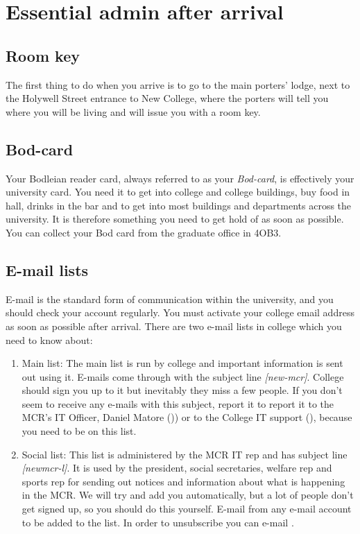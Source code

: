 
\chapter{Essential admin after arrival}

\section{Room key}
The first thing to do when you arrive is to go to the main porters' lodge, next
to the Holywell Street entrance to New College, where the porters will tell you where you will be living and will issue you with a room key.
\section{Bod-card}
Your Bodleian reader card, always referred to as your \emph{Bod-card}, is effectively
your university card. You need it to get into college and college buildings, buy food in hall, drinks in the bar and to get into most buildings and departments across the university. It is therefore something you need to get hold of as soon as possible. You can collect your Bod card from the graduate office in 4OB3.
\section{E-mail lists}
E-mail is the standard form of communication within the university, and you should check your account regularly. You must activate your college email address as soon as possible after arrival. There are two e-mail lists in college which you need to know about:
\begin{enumerate}
  \item Main list: The main list is run by college and important
information is sent out using it. E-mails come through with the subject line
\emph{[new-mcr]}. College should sign you up to it but inevitably they miss a
few people. If you don't seem to receive any e-mails with this subject, report
it to report it to the MCR's IT Officer, Daniel Matore (\href{mailto:daniel.matore@new.ox.ac.uk}{})) or to the College IT support (\href{mailto:it-support@new.ox.ac.uk}{}), because you need to be on this list.
  \item Social list: This list is administered by the MCR IT rep and has subject line
\emph{[newmcr-l]}. It is used by the president, social secretaries, welfare rep and sports rep for
sending out notices and information about what is happening in the MCR. We will
try and add you automatically, but a lot of people don't get signed up, so you
should do this yourself. E-mail
\href{mailto:newmcr-l-subscribe@maillist.ox.ac.uk }{}
from any e-mail account to be added to the list. In order to unsubscribe you can
e-mail
\href{mailto:newmcr-l-unsubscribe@maillist.ox.ac.uk}{}.
\end{enumerate}

